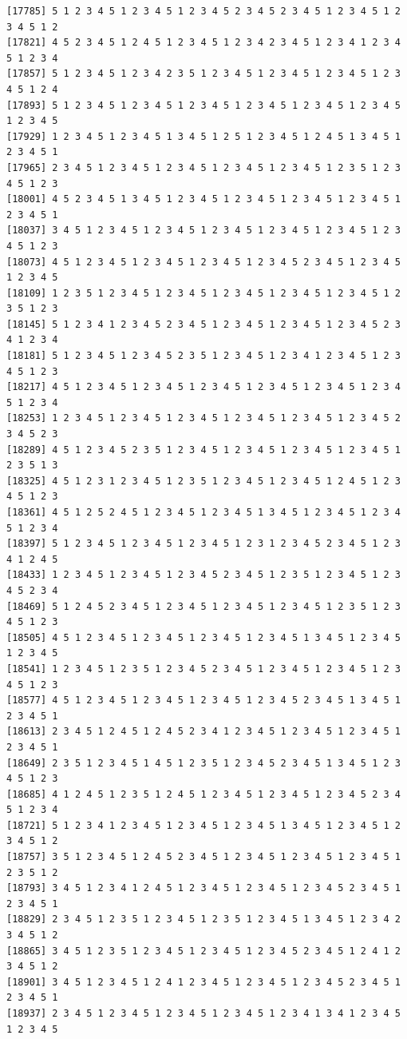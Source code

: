 \documentclass[
  11pt,
]{book}
\begin{document}
\begin{verbatim}
[17785] 5 1 2 3 4 5 1 2 3 4 5 1 2 3 4 5 2 3 4 5 2 3 4 5 1 2 3 4 5 1 2 3 4 5 1 2
[17821] 4 5 2 3 4 5 1 2 4 5 1 2 3 4 5 1 2 3 4 2 3 4 5 1 2 3 4 1 2 3 4 5 1 2 3 4
[17857] 5 1 2 3 4 5 1 2 3 4 2 3 5 1 2 3 4 5 1 2 3 4 5 1 2 3 4 5 1 2 3 4 5 1 2 4
[17893] 5 1 2 3 4 5 1 2 3 4 5 1 2 3 4 5 1 2 3 4 5 1 2 3 4 5 1 2 3 4 5 1 2 3 4 5
[17929] 1 2 3 4 5 1 2 3 4 5 1 3 4 5 1 2 5 1 2 3 4 5 1 2 4 5 1 3 4 5 1 2 3 4 5 1
[17965] 2 3 4 5 1 2 3 4 5 1 2 3 4 5 1 2 3 4 5 1 2 3 4 5 1 2 3 5 1 2 3 4 5 1 2 3
[18001] 4 5 2 3 4 5 1 3 4 5 1 2 3 4 5 1 2 3 4 5 1 2 3 4 5 1 2 3 4 5 1 2 3 4 5 1
[18037] 3 4 5 1 2 3 4 5 1 2 3 4 5 1 2 3 4 5 1 2 3 4 5 1 2 3 4 5 1 2 3 4 5 1 2 3
[18073] 4 5 1 2 3 4 5 1 2 3 4 5 1 2 3 4 5 1 2 3 4 5 2 3 4 5 1 2 3 4 5 1 2 3 4 5
[18109] 1 2 3 5 1 2 3 4 5 1 2 3 4 5 1 2 3 4 5 1 2 3 4 5 1 2 3 4 5 1 2 3 5 1 2 3
[18145] 5 1 2 3 4 1 2 3 4 5 2 3 4 5 1 2 3 4 5 1 2 3 4 5 1 2 3 4 5 2 3 4 1 2 3 4
[18181] 5 1 2 3 4 5 1 2 3 4 5 2 3 5 1 2 3 4 5 1 2 3 4 1 2 3 4 5 1 2 3 4 5 1 2 3
[18217] 4 5 1 2 3 4 5 1 2 3 4 5 1 2 3 4 5 1 2 3 4 5 1 2 3 4 5 1 2 3 4 5 1 2 3 4
[18253] 1 2 3 4 5 1 2 3 4 5 1 2 3 4 5 1 2 3 4 5 1 2 3 4 5 1 2 3 4 5 2 3 4 5 2 3
[18289] 4 5 1 2 3 4 5 2 3 5 1 2 3 4 5 1 2 3 4 5 1 2 3 4 5 1 2 3 4 5 1 2 3 5 1 3
[18325] 4 5 1 2 3 1 2 3 4 5 1 2 3 5 1 2 3 4 5 1 2 3 4 5 1 2 4 5 1 2 3 4 5 1 2 3
[18361] 4 5 1 2 5 2 4 5 1 2 3 4 5 1 2 3 4 5 1 3 4 5 1 2 3 4 5 1 2 3 4 5 1 2 3 4
[18397] 5 1 2 3 4 5 1 2 3 4 5 1 2 3 4 5 1 2 3 1 2 3 4 5 2 3 4 5 1 2 3 4 1 2 4 5
[18433] 1 2 3 4 5 1 2 3 4 5 1 2 3 4 5 2 3 4 5 1 2 3 5 1 2 3 4 5 1 2 3 4 5 2 3 4
[18469] 5 1 2 4 5 2 3 4 5 1 2 3 4 5 1 2 3 4 5 1 2 3 4 5 1 2 3 5 1 2 3 4 5 1 2 3
[18505] 4 5 1 2 3 4 5 1 2 3 4 5 1 2 3 4 5 1 2 3 4 5 1 3 4 5 1 2 3 4 5 1 2 3 4 5
[18541] 1 2 3 4 5 1 2 3 5 1 2 3 4 5 2 3 4 5 1 2 3 4 5 1 2 3 4 5 1 2 3 4 5 1 2 3
[18577] 4 5 1 2 3 4 5 1 2 3 4 5 1 2 3 4 5 1 2 3 4 5 2 3 4 5 1 3 4 5 1 2 3 4 5 1
[18613] 2 3 4 5 1 2 4 5 1 2 4 5 2 3 4 1 2 3 4 5 1 2 3 4 5 1 2 3 4 5 1 2 3 4 5 1
[18649] 2 3 5 1 2 3 4 5 1 4 5 1 2 3 5 1 2 3 4 5 2 3 4 5 1 3 4 5 1 2 3 4 5 1 2 3
[18685] 4 1 2 4 5 1 2 3 5 1 2 4 5 1 2 3 4 5 1 2 3 4 5 1 2 3 4 5 2 3 4 5 1 2 3 4
[18721] 5 1 2 3 4 1 2 3 4 5 1 2 3 4 5 1 2 3 4 5 1 3 4 5 1 2 3 4 5 1 2 3 4 5 1 2
[18757] 3 5 1 2 3 4 5 1 2 4 5 2 3 4 5 1 2 3 4 5 1 2 3 4 5 1 2 3 4 5 1 2 3 5 1 2
[18793] 3 4 5 1 2 3 4 1 2 4 5 1 2 3 4 5 1 2 3 4 5 1 2 3 4 5 2 3 4 5 1 2 3 4 5 1
[18829] 2 3 4 5 1 2 3 5 1 2 3 4 5 1 2 3 5 1 2 3 4 5 1 3 4 5 1 2 3 4 2 3 4 5 1 2
[18865] 3 4 5 1 2 3 5 1 2 3 4 5 1 2 3 4 5 1 2 3 4 5 2 3 4 5 1 2 4 1 2 3 4 5 1 2
[18901] 3 4 5 1 2 3 4 5 1 2 4 1 2 3 4 5 1 2 3 4 5 1 2 3 4 5 2 3 4 5 1 2 3 4 5 1
[18937] 2 3 4 5 1 2 3 4 5 1 2 3 4 5 1 2 3 4 5 1 2 3 4 1 3 4 1 2 3 4 5 1 2 3 4 5

\end{verbatim}
\end{document}
